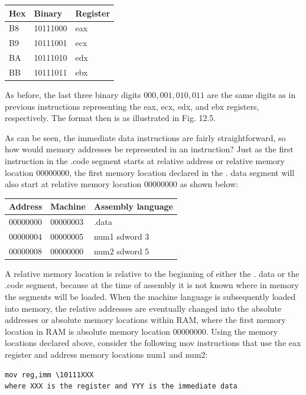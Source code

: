 \documentclass[10pt]{book}
\begin{document}
\begin{center}
\begin{tabular}{|l|l|l|}
\hline
Hex & Binary & Register \\
\hline
B8 & 10111000 & eax \\
\hline
B9 & 10111001 & ecx \\
\hline
BA & 10111010 & edx \\
\hline
BB & 10111011 & ebx \\
\hline
\end{tabular}
\end{center}

As before, the last three binary digits $000,001,010,011$ are the same digits as in previous instructions representing the eax, ecx, edx, and ebx registers, respectively. The format then is as illustrated in Fig. 12.5.

As can be seen, the immediate data instructions are fairly straightforward, so how would memory addresses be represented in an instruction? Just as the first instruction in the .code segment starts at relative address or relative memory location 00000000, the first memory location declared in the . data segment will also start at relative memory location 00000000 as shown below:

\begin{center}
\begin{tabular}{|l|l|l|}
\hline
Address & Machine & Assembly language \\
\hline\hline
00000000 & 00000003 & .data \\
\hline
00000004 & 00000005 & num1 sdword 3 \\
\hline
00000008 & 00000000 & num2 sdword 5 \\
\hline
\end{tabular}
\end{center}

A relative memory location is relative to the beginning of either the . data or the .code segment, because at the time of assembly it is not known where in memory the segments will be loaded. When the machine language is subsequently loaded into memory, the relative addresses are eventually changed into the absolute addresses or absolute memory locations within RAM, where the first memory location in RAM is absolute memory location 00000000. Using the memory locations declared above, consider the following mov instructions that use the eax register and address memory locations num1 and num2:

\begin{verbatim}
mov reg,imm \10111XXX 
where XXX is the register and YYY is the immediate data
\end{verbatim}
\end{document}
